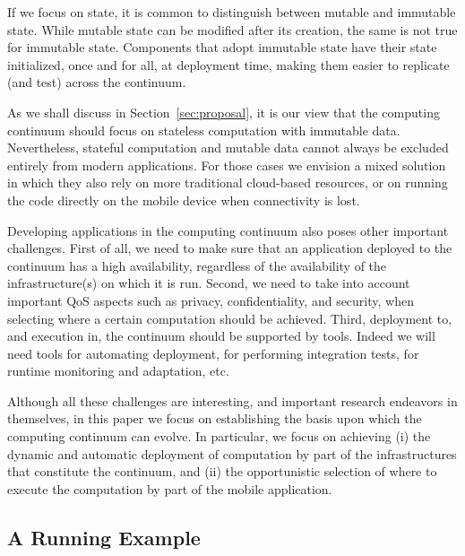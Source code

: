 If we focus on state, it is common to distinguish between mutable and immutable state. While mutable state can be modified after its creation, the same is not true for immutable state. Components that adopt immutable state have their state initialized, once and for all, at deployment time, making them easier to replicate (and test) across the continuum.

As we shall discuss in Section~\ref{sec:proposal}, it is our view that the computing continuum should focus on stateless computation with immutable data. Nevertheless, stateful computation and mutable data cannot always be excluded entirely from modern applications. For those cases we envision a mixed solution in which they also rely on more traditional cloud-based resources, or on running the code directly on the mobile device when connectivity is lost.

Developing applications in the computing continuum also poses other important challenges. First of all, we need to make sure that an application deployed to the continuum has a high availability, regardless of the availability of the infrastructure(s) on which it is run. Second, we need to take into account important QoS aspects such as privacy, confidentiality, and security, when selecting where a certain computation should be achieved. Third, deployment to, and execution in, the continuum should be supported by tools. Indeed we will need tools for automating deployment, for performing integration tests, for runtime monitoring and adaptation, etc. 

Although all these challenges are interesting, and important research endeavors in themselves, in this paper we focus on establishing the basis upon which the computing continuum can evolve. In particular, we focus on achieving (i) the dynamic and automatic deployment of computation by part of the infrastructures that constitute the continuum, and (ii) the opportunistic selection of where to execute the computation by part of the mobile application.

\subsection{A Running Example}
\label{sub:example}

